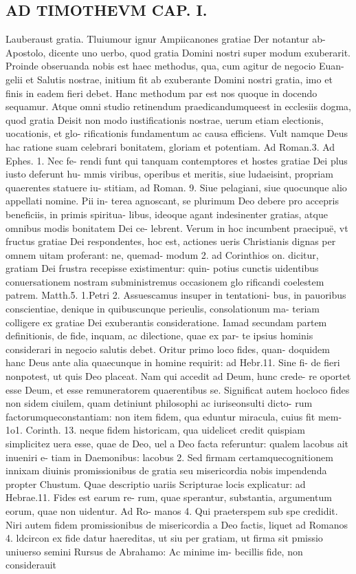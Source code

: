 \documentclass{article}
\begin{document}
\begin{pages}
\section*{AD TIMOTHEVM CAP. I. }
\marginpar{[ p.46 ]}\pstart Lauberaust gratia. Tluiumour ignur Ampiicanones gratiae Der notantur ab- Apostolo, dicente uno uerbo, quod gratia Domini nostri super modum exuberarit.  \pend\pstart Proinde obseruanda nobis est haec methodus, qua, cum agitur de negocio Euan- gelii et Salutis nostrae, initium fit ab exuberante Domini nostri gratia, imo et finis in eadem fieri debet. Hanc methodum par est nos quoque in docendo sequamur. Atque omni studio retinendum praedicandumqueest in ecclesiis dogma, quod gratia Deisit non modo iustificationis nostrae, uerum etiam electionis, uocationis, et glo- rificationis fundamentum ac causa efficiens. Vult namque  Deus hac ratione suam celebrari bonitatem, gloriam et potentiam. Ad Roman.3. Ad Ephes. 1. Nec fe- rendi funt qui tanquam contemptores et hostes gratiae Dei plus iusto deferunt hu- mmis viribus, operibus et meritis, siue ludaeisint, propriam quaerentes statuere iu- stitiam, ad Roman. 9. Siue pelagiani, siue quocunque alio appellati nomine. Pii in- terea agnoscant, se plurimum Deo debere pro accepris beneficiis, in primis spiritua- libus, ideoque  agant indesinenter gratias, atque omnibus modis bonitatem Dei ce- lebrent. Verum in hoc incumbent praecipuë, vt fructus gratiae Dei respondentes, hoc est, actiones ueris Christianis dignas per omnem uitam proferant: ne, quemad- modum 2. ad Corinthios on. dicitur, gratiam Dei frustra recepisse existimentur: quin- potius cunctis uidentibus conuersationem nostram subministremus occasionem glo rificandi coelestem patrem. Matth.5. 1.Petri 2. Assuescamus insuper in tentationi- bus, in pauoribus conscientiae, denique in quibuscunque  perieulis, consolationum ma- teriam colligere ex gratiae Dei exuberantis consideratione.  \pend\pstart Iamad secundam partem definitionis, de fide, inquam, ac dilectione, quae ex par- te ipsius hominis considerari in negocio salutis debet. Oritur primo loco fides, quan- doquidem hanc Deus ante alia quaecunque in homine requirit: ad Hebr.11. Sine fi- de fieri nonpotest, ut quis Deo placeat. Nam qui accedit ad Deum, hunc crede- re oportet esse Deum, et esse remuneratorem quaerentibus se. Significat autem hocloco fides non sidem ciuilem, quam detiniunt philosophi ac iuriseonsulti dicto- rum factorumqueconstantiam: non item fidem, qua eduntur miracula, cuius fit mem- 1o1. Corinth. 13. neque fidem historicam, qua uidelicet credit quispiam simplicitez uera esse, quae de Deo, uel a Deo facta referuntur: qualem lacobus ait inueniri e- tiam in Daemonibus: lacobus 2. Sed firmam certamquecognitionem innixam diuinis promissionibus de gratia seu misericordia nobis impendenda propter Chustum. Quae descriptio uariis Scripturae locis explicatur: ad Hebrae.11. Fides est earum re- rum, quae sperantur, substantia, argumentum eorum, quae non uidentur. Ad Ro- manos 4. Qui praeterspem sub spe credidit. Niri autem fidem promissionibus de misericordia a Deo factis, liquet ad Romanos 4. ldcircon ex fide datur haereditas, ut siu per gratiam, ut firma sit pmissio uniuerso semini Rursus de Abrahamo: Ac minime im- becillis fide, non considerauit 
\end{pages}
\end{document}
